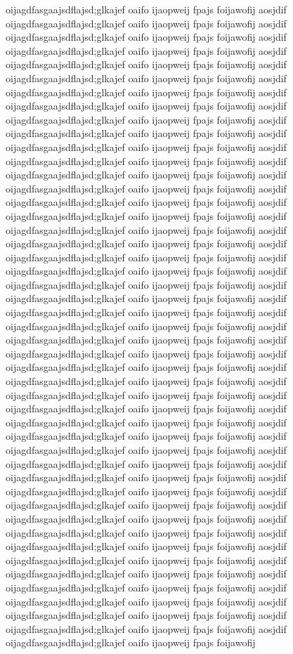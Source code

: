 \documentclass[twoside,a4paper,twocolumn,landscape]{PhanRaw}
\begin{document}
oijagdfasgaajsdflajsd;glkajef oaifo ijaopweij fpajs foijawofij aosjdif oijagdfasgaajsdflajsd;glkajef oaifo ijaopweij fpajs foijawofij aosjdif oijagdfasgaajsdflajsd;glkajef oaifo ijaopweij fpajs foijawofij aosjdif oijagdfasgaajsdflajsd;glkajef oaifo ijaopweij fpajs foijawofij aosjdif oijagdfasgaajsdflajsd;glkajef oaifo ijaopweij fpajs foijawofij aosjdif oijagdfasgaajsdflajsd;glkajef oaifo ijaopweij fpajs foijawofij aosjdif oijagdfasgaajsdflajsd;glkajef oaifo ijaopweij fpajs foijawofij aosjdif oijagdfasgaajsdflajsd;glkajef oaifo ijaopweij fpajs foijawofij aosjdif oijagdfasgaajsdflajsd;glkajef oaifo ijaopweij fpajs foijawofij aosjdif oijagdfasgaajsdflajsd;glkajef oaifo ijaopweij fpajs foijawofij aosjdif oijagdfasgaajsdflajsd;glkajef oaifo ijaopweij fpajs foijawofij aosjdif oijagdfasgaajsdflajsd;glkajef oaifo ijaopweij fpajs foijawofij aosjdif oijagdfasgaajsdflajsd;glkajef oaifo ijaopweij fpajs foijawofij aosjdif oijagdfasgaajsdflajsd;glkajef oaifo ijaopweij fpajs foijawofij aosjdif oijagdfasgaajsdflajsd;glkajef oaifo ijaopweij fpajs foijawofij aosjdif oijagdfasgaajsdflajsd;glkajef oaifo ijaopweij fpajs foijawofij aosjdif oijagdfasgaajsdflajsd;glkajef oaifo ijaopweij fpajs foijawofij aosjdif oijagdfasgaajsdflajsd;glkajef oaifo ijaopweij fpajs foijawofij aosjdif oijagdfasgaajsdflajsd;glkajef oaifo ijaopweij fpajs foijawofij aosjdif oijagdfasgaajsdflajsd;glkajef oaifo ijaopweij fpajs foijawofij aosjdif oijagdfasgaajsdflajsd;glkajef oaifo ijaopweij fpajs foijawofij aosjdif oijagdfasgaajsdflajsd;glkajef oaifo ijaopweij fpajs foijawofij aosjdif oijagdfasgaajsdflajsd;glkajef oaifo ijaopweij fpajs foijawofij aosjdif oijagdfasgaajsdflajsd;glkajef oaifo ijaopweij fpajs foijawofij aosjdif oijagdfasgaajsdflajsd;glkajef oaifo ijaopweij fpajs foijawofij aosjdif oijagdfasgaajsdflajsd;glkajef oaifo ijaopweij fpajs foijawofij aosjdif oijagdfasgaajsdflajsd;glkajef oaifo ijaopweij fpajs foijawofij aosjdif oijagdfasgaajsdflajsd;glkajef oaifo ijaopweij fpajs foijawofij aosjdif oijagdfasgaajsdflajsd;glkajef oaifo ijaopweij fpajs foijawofij aosjdif oijagdfasgaajsdflajsd;glkajef oaifo ijaopweij fpajs foijawofij aosjdif oijagdfasgaajsdflajsd;glkajef oaifo ijaopweij fpajs foijawofij aosjdif oijagdfasgaajsdflajsd;glkajef oaifo ijaopweij fpajs foijawofij aosjdif oijagdfasgaajsdflajsd;glkajef oaifo ijaopweij fpajs foijawofij aosjdif oijagdfasgaajsdflajsd;glkajef oaifo ijaopweij fpajs foijawofij aosjdif oijagdfasgaajsdflajsd;glkajef oaifo ijaopweij fpajs foijawofij aosjdif oijagdfasgaajsdflajsd;glkajef oaifo ijaopweij fpajs foijawofij aosjdif oijagdfasgaajsdflajsd;glkajef oaifo ijaopweij fpajs foijawofij aosjdif oijagdfasgaajsdflajsd;glkajef oaifo ijaopweij fpajs foijawofij aosjdif oijagdfasgaajsdflajsd;glkajef oaifo ijaopweij fpajs foijawofij aosjdif oijagdfasgaajsdflajsd;glkajef oaifo ijaopweij fpajs foijawofij aosjdif oijagdfasgaajsdflajsd;glkajef oaifo ijaopweij fpajs foijawofij aosjdif oijagdfasgaajsdflajsd;glkajef oaifo ijaopweij fpajs foijawofij aosjdif oijagdfasgaajsdflajsd;glkajef oaifo ijaopweij fpajs foijawofij aosjdif oijagdfasgaajsdflajsd;glkajef oaifo ijaopweij fpajs foijawofij aosjdif oijagdfasgaajsdflajsd;glkajef oaifo ijaopweij fpajs foijawofij aosjdif oijagdfasgaajsdflajsd;glkajef oaifo ijaopweij fpajs foijawofij aosjdif oijagdfasgaajsdflajsd;glkajef oaifo ijaopweij fpajs foijawofij 
\end{document}
